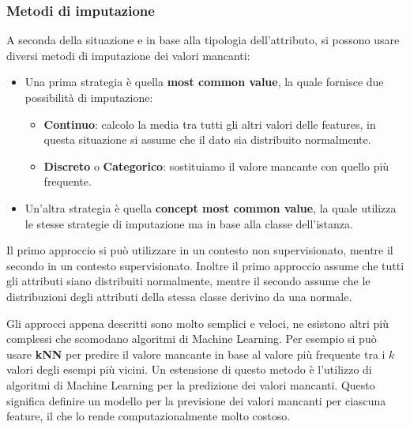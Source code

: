\subsubsection{Metodi di imputazione}
A seconda della situazione e in base alla tipologia dell'attributo, si possono
usare diversi metodi di imputazione dei valori mancanti:
\begin{itemize}
      \item Una prima strategia è quella \textbf{most common value}, la quale
            fornisce due possibilità di imputazione:
            \begin{itemize}
                  \item \textbf{Continuo}: calcolo la media tra tutti gli altri
                        valori delle features, in questa situazione si assume che il
                        dato sia distribuito normalmente.
                  \item \textbf{Discreto} o \textbf{Categorico}: sostituiamo il valore
                        mancante con quello più frequente.
            \end{itemize}
      \item Un'altra strategia è quella \textbf{concept most common value}, la
            quale utilizza le stesse strategie di imputazione ma in base alla
            classe dell'istanza.
\end{itemize}
Il primo approccio si può utilizzare in un contesto non supervisionato, mentre il
secondo in un contesto supervisionato. Inoltre il primo approccio assume che tutti
gli attributi siano distribuiti normalmente, mentre il secondo assume che le
distribuzioni degli attributi della stessa classe derivino da una normale.

Gli approcci appena descritti sono molto semplici e veloci, ne esistono altri più
complessi che scomodano algoritmi di Machine Learning. Per esempio si può usare
\textbf{kNN} per predire il valore mancante in base al valore più frequente tra
i $k$ valori degli esempi più vicini. Un estensione di questo metodo è l'utilizzo
di algoritmi di Machine Learning per la predizione dei valori mancanti. Questo
significa definire un modello per la previsione dei valori mancanti per ciascuna
feature, il che lo rende computazionalmente molto costoso.

